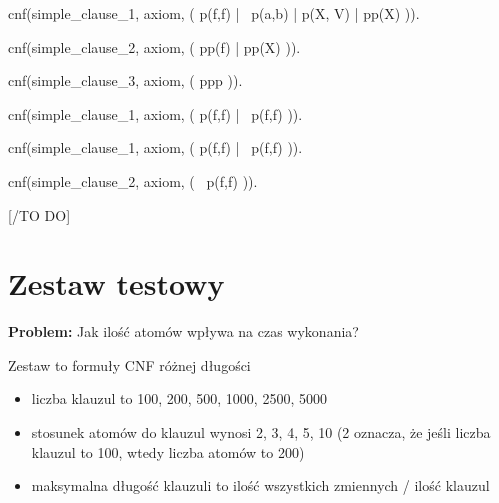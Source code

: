 \documentclass[a4paper,12pt]{article}
\begin{document}
\begin{tptpcode}
cnf(simple_clause_1, axiom,
    ( p(f,f) | ~p(a,b) | p(X, V) | pp(X) )).

cnf(simple_clause_2, axiom,
    ( pp(f) | pp(X) )).

cnf(simple_clause_3, axiom,
    ( ppp )).

\end{tptpcode}

\begin{tptpcode}
cnf(simple_clause_1, axiom,
    ( p(f,f) | ~p(f,f) )).

\end{tptpcode}

\begin{tptpcode}
cnf(simple_clause_1, axiom,
    ( p(f,f) | ~p(f,f) )).

cnf(simple_clause_2, axiom,
    ( ~p(f,f) )).

\end{tptpcode}
[/TO DO]
\newpage
\section{Zestaw testowy}


\noindent
\textbf{Problem:} Jak ilość atomów wpływa na czas wykonania?

Zestaw to formuły CNF różnej długości
\begin{itemize}
  \item liczba klauzul to 100, 200, 500, 1000, 2500, 5000
  \item stosunek atomów do klauzul wynosi 2, 3, 4, 5, 10 (2 oznacza, że jeśli liczba klauzul to 100, wtedy liczba atomów to 200)
  \item maksymalna długość klauzuli to ilość wszystkich zmiennych / ilość klauzul
\end{itemize}
\end{document}
